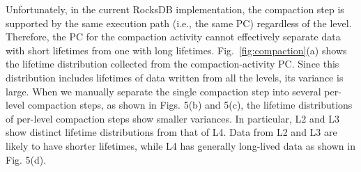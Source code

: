 Unfortunately, in the current RocksDB implementation, the compaction step is supported 
by the same execution path (i.e., the same PC) regardless of the level.
Therefore, the PC for the compaction activity cannot effectively separate data with 
short lifetimes from one with long lifetimes.
Fig.~\ref{fig:compaction}(a) shows 
the lifetime distribution collected from the compaction-activity PC.  
Since this distribution includes lifetimes of data written from all the levels, 
its variance is large.  
When we manually separate the single compaction step into several per-level compaction steps, 
as shown in Figs. 5(b) and 5(c), the lifetime distributions of per-level compaction steps 
show smaller variances.   
In particular, L2 and L3 show distinct lifetime distributions from that of L4.
Data from L2 and L3 are likely to have shorter lifetimes, while L4 has generally
long-lived data as shown in Fig. 5(d).


